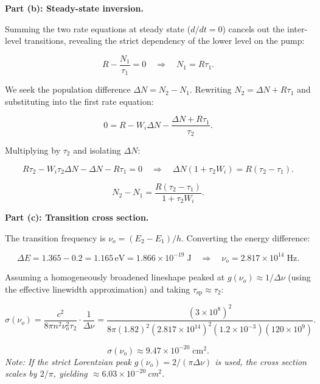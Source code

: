 \textbf{Part (b): Steady-state inversion.}

Summing the two rate equations at steady state ($d/dt = 0$) cancels out the inter-level transitions, revealing the strict dependency of the lower level on the pump:

\begin{equation*}
  R - \frac{N_1}{\tau_1} = 0 \quad\Longrightarrow\quad N_1 = R\tau_1.
\end{equation*}

We seek the population difference $\Delta N = N_2 - N_1$. Rewriting $N_2 = \Delta N + R\tau_1$ and substituting into the first rate equation:

\begin{equation*}
  0 = R - W_i\Delta N - \frac{\Delta N + R\tau_1}{\tau_2}.
\end{equation*}

Multiplying by $\tau_2$ and isolating $\Delta N$:

\begin{equation*}
  R\tau_2 - W_i\tau_2\Delta N - \Delta N - R\tau_1 = 0 \quad\Longrightarrow\quad
  \Delta N(1 + \tau_2 W_i) = R(\tau_2 - \tau_1).
\end{equation*}

\begin{equation*}
  \boxed{N_2 - N_1 = \frac{R(\tau_2 - \tau_1)}{1 + \tau_2 W_i}.}
\end{equation*}

\textbf{Part (c): Transition cross section.}

The transition frequency is $\nu_o = (E_2 - E_1)/h$. Converting the energy difference:

\begin{equation*}
  \Delta E = 1.365 - 0.2 = 1.165\,\text{eV} = 1.866\times10^{-19}\;\text{J} \quad\Longrightarrow\quad
  \nu_o = 2.817\times10^{14}\;\text{Hz}.
\end{equation*}

Assuming a homogeneously broadened lineshape peaked at $g(\nu_o) \approx 1/\Delta\nu$ (using the effective linewidth approximation) and taking $\tau_\text{sp} \approx \tau_2$:

\begin{equation*}
  \sigma(\nu_o) = \frac{c^{2}}{8\pi n^{2}\nu_o^{2}\tau_2}\cdot\frac{1}{\Delta\nu}
  = \frac{(3\times10^{8})^{2}}{8\pi(1.82)^{2}(2.817\times10^{14})^{2}(1.2\times10^{-3})(120\times10^{9})}.
\end{equation*}

\begin{equation*}
  \boxed{\sigma(\nu_o) \approx 9.47\times10^{-20}\;\text{cm}^{2}.}
\end{equation*}
\emph{Note: If the strict Lorentzian peak $g(\nu_o)=2/(\pi\Delta\nu)$ is used, the cross section scales by $2/\pi$, yielding $\approx 6.03\times10^{-20}$\,cm$^{2}$.}

